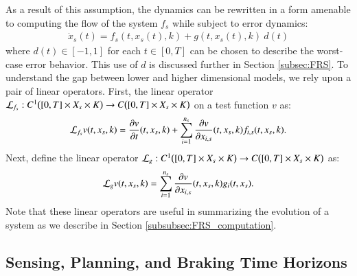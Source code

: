 As a result of this assumption, the dynamics can be rewritten in a form amenable to computing the flow of the system $f_s$ while subject to error dynamics:
\begin{align}
\label{eq:error_low_model}
\dot{x}_s(t) = f_s(t,x_s(t),k) + g(t,x_s(t),k)~d(t)
\end{align}
where $d(t) \in [-1,1]$ for each $ t \in [0,T]$ can be chosen to describe the worst-case error behavior.
This use of $d$ is discussed further in Section \ref{subsec:FRS}.
To understand the gap between lower and higher dimensional models, we rely upon a pair of linear operators. 
First, the linear operator $\mathcal{L}_{f_s}:C^1\big([0,T] \times X_s \times K \big) \to C\big( [0,T] \times X_s \times K \big)$ on a test function $v$ as:
\begin{equation}
\mathcal{L}_{f_s} v(t,x_s,k) = \frac{\partial v}{\partial t}(t,x_s,k) + \sum_{i = 1}^{n_s} \frac{\partial v}{\partial x_{i,s}}(t,x_s,k) f_{i,s}(t,x_s,k).
\end{equation}
Next, define the linear operator $\mathcal{L}_g:C^1\big([0,T] \times X_s \times K \big) \to C\big( [0,T]\times X_s \times K\big)$ as:
\begin{equation}
\mathcal{L}_g v(t,x_s,k)  = \sum_{i = 1}^{n_s} \frac{\partial v}{\partial x_{i,s}}(t,x_s,k) g_{i}(t,x_s).
\end{equation}
Note that these linear operators are useful in summarizing the evolution of a system as we describe in Section \ref{subsubsec:FRS_computation}.



\subsection{Sensing, Planning, and Braking Time Horizons}
\label{subsec:time}

